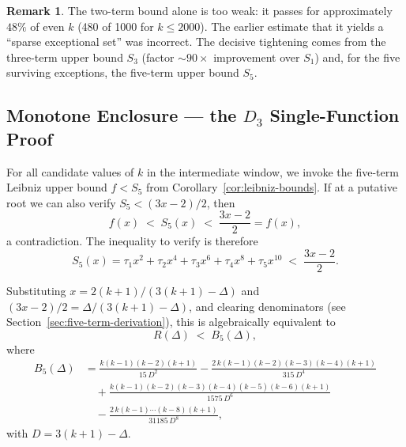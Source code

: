 \documentclass[12pt,a4paper]{article}
\theoremstyle{plain}
\theoremstyle{definition}
\newtheorem{remark}[theorem]{Remark}
\begin{document}
\begin{remark}
  The two-term bound alone is too weak: it passes for approximately
  $48\%$ of even $k$ (480 of 1000 for $k \le 2000$).  The earlier
  estimate that it yields a ``sparse exceptional set'' was incorrect.
  The decisive tightening comes from the three-term upper bound $S_3$
  (factor $\sim 90\times$ improvement over $S_1$) and, for the five
  surviving exceptions, the five-term upper bound $S_5$.
\end{remark}

\subsection{Monotone Enclosure --- the $D_3$ Single-Function Proof}
\label{sec:five-term}

For all candidate values of $k$ in the intermediate window, we invoke
the five-term Leibniz upper bound $f < S_5$ from
Corollary~\ref{cor:leibniz-bounds}.  If at a putative root we can also
verify $S_5 < (3x-2)/2$, then
\[
  f(x) \; < \; S_5(x) \; < \; \frac{3x-2}{2} = f(x),
\]
a contradiction.  The inequality to verify is therefore
\begin{equation}\label{eq:five-term-ineq}
  S_5(x) = \tau_1 x^2 + \tau_2 x^4 + \tau_3 x^6 + \tau_4 x^8
           + \tau_5 x^{10}
  \; < \; \frac{3x-2}{2}.
\end{equation}

Substituting $x = 2(k+1)/(3(k+1)-\Delta)$ and
$(3x-2)/2 = \Delta/(3(k+1)-\Delta)$, and clearing denominators
(see Section~\ref{sec:five-term-derivation}), this is algebraically
equivalent to
\begin{equation}\label{eq:B5-bound}
  R(\Delta) \; < \; B_5(\Delta),
\end{equation}
where
\begin{equation}\label{eq:B5-def}
  \begin{aligned}
    B_5(\Delta) &= \frac{k(k-1)(k-2)(k+1)}{15\,D^2}
      - \frac{2\,k(k-1)(k-2)(k-3)(k-4)(k+1)}{315\,D^4} \\
    &\quad + \frac{k(k-1)(k-2)(k-3)(k-4)(k-5)(k-6)(k+1)}{1575\,D^6} \\
    &\quad - \frac{2\,k(k-1)\cdots(k-8)(k+1)}{31185\,D^8},
  \end{aligned}
\end{equation}
with $D = 3(k+1)-\Delta$.
\end{document}
